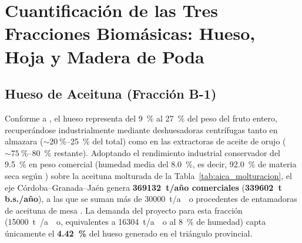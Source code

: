 \documentclass{report}
\begin{document}
\section{Cuantificación de las Tres Fracciones Biomásicas: Hueso, Hoja y Madera de Poda}

\subsection{Hueso de Aceituna (Fracción B-1)}
Conforme a \textcite[Secciones~1--2]{ElFessikh2025}, el hueso representa del \SI{9}{\percent} al \SI{27}{\percent} del peso del fruto entero, recuperándose industrialmente mediante deshuesadoras centrífugas tanto en almazara ($\sim \SI{20}{\percent}$--\SI{25}{\percent} del total) como en las extractoras de aceite de orujo ($\sim \SI{75}{\percent}$--\SI{80}{\percent} restante). Adoptando el rendimiento industrial conservador del \SI{9.5}{\percent} en peso comercial (humedad media del \SI{8.0}{\percent}, es decir, \SI{92.0}{\percent} de materia seca según \textcite[Sección~2.1]{RomeroGarcia2022}) sobre la aceituna molturada de la Tabla~\ref{tab:aica_molturacion}, el eje Córdoba--Granada--Jaén genera \textbf{\num{369132}~t/año comerciales} (\textbf{\num{339602}~t b.s./año}), a las que se suman más de \SI{30000}{\tonne/ao} procedentes de entamadoras de aceituna de mesa \autocite{SIAE2025}. La demanda del proyecto para esta fracción (\SI{15000}{\tonne{}/ao}, equivalentes a \SI{16304}{\tonne/ao} al \SI{8}{\percent} de humedad) capta únicamente el \textbf{\SI{4.42}{\percent}} del hueso generado en el triángulo provincial.
\end{document}
